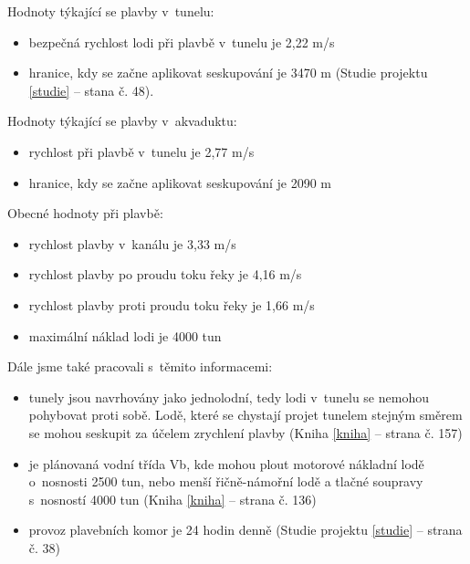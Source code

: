 \documentclass[11pt,a4paper]{article}
\begin{document}
    \noindent
    Hodnoty týkající se plavby v~tunelu:

    \begin{itemize}
      \item bezpečná rychlost lodi při plavbě v~tunelu je 2,22 m/s

      \item hranice, kdy se začne aplikovat seskupování je 3470 m
            (Studie projektu \ref{studie} -- stana č. 48).
    \end{itemize}

    \noindent
    Hodnoty týkající se plavby v~akvaduktu:

    \begin{itemize}
      \item rychlost při plavbě v~tunelu je 2,77 m/s
      \item hranice, kdy se začne aplikovat seskupování je 2090 m
    \end{itemize}

    \break

    \noindent
    Obecné hodnoty při plavbě:

    \begin{itemize}
      \item rychlost plavby v~kanálu je 3,33 m/s
      \item rychlost plavby po proudu toku řeky je 4,16 m/s
      \item rychlost plavby proti proudu toku řeky je 1,66 m/s
      \item maximální náklad lodi je 4000 tun
    \end{itemize}

    \noindent
    Dále jsme také pracovali s~těmito informacemi:

    \begin{itemize}
      \item tunely jsou navrhovány jako jednolodní, tedy lodi v~tunelu se
            nemohou pohybovat proti sobě. Lodě, které se chystají projet
            tunelem stejným směrem se mohou seskupit za účelem zrychlení plavby
            (Kniha \ref{kniha} -- strana č. 157)
      \item je plánovaná vodní třída Vb, kde mohou plout motorové nákladní lodě
            o~nosnosti 2500 tun, nebo menší řičně-námořní lodě a tlačné
            soupravy s~nosností 4000 tun
            (Kniha \ref{kniha} -- strana č. 136)
      \item provoz plavebních komor je 24 hodin denně
            (Studie projektu \ref{studie} -- strana č. 38)
    \end{itemize}
        
\end{document}
